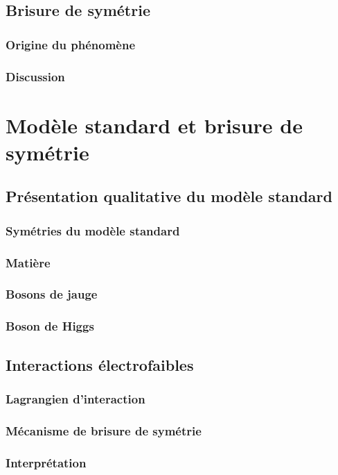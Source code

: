 \documentclass{article}
\begin{document}
		\subsection{Brisure de symétrie}
			\subsubsection{Origine du phénomène}
			\subsubsection{Discussion}

		
		
		\section{Modèle standard et brisure de symétrie}
		
			\subsection{Présentation qualitative du modèle standard}
				\subsubsection{Symétries du modèle standard}
				\subsubsection{Matière}
				\subsubsection{Bosons de jauge}
				\subsubsection{Boson de Higgs}
			\subsection{Interactions électrofaibles}
				\subsubsection{Lagrangien d'interaction}
				\subsubsection{Mécanisme de brisure de symétrie}
				\subsubsection{Interprétation}
\end{document}
